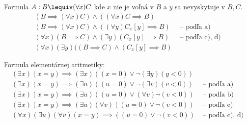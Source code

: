 \begin{priklad}
    \noindent
    Formula $A: B \lequiv (\forall x) C$ kde $x$ nie je voľná
    v $B$ a $y$ sa nevyskytuje v $B,C$.
    \begin{align*}
       (B \implies (\forall x) C) \land ((\forall x) C \implies B) &\\
       (B \implies (\forall x) C) \land ((\forall y) C_x[y] \implies B) 
       & \mbox{ -- podľa a)} \\
       (\forall x)(B \implies C) \land (\exists y) (C_x[y] \implies B) 
       & \mbox{ -- podľa c), d)} \\
       (\forall x)(\exists y)((B \implies C) \land (C_x[y] \implies B)
    \end{align*}
\end{priklad}

\begin{priklad}
    Formula elementárnej aritmetiky:
    \begin{align*}
        (\exists x) (x=y) \implies (\exists x)((x=0) \lor
                    \neg (\exists y)(y<0))& \\
        (\exists x) (x=y) \implies (\exists u)((u=0) \lor
                    \neg (\exists v)(v<0)) &\mbox{ -- podľa a)}\\
        (\exists x) (x=y) \implies (\exists u)((u=0) \lor
                    (\forall  v) \neg(v<0)) &\mbox{ -- podľa b)}\\
        (\exists x) (x=y) \implies (\exists u)(\forall v)
                ((u=0) \lor \neg(v<0)) &\mbox{ -- podľa e)}\\
        (\forall x)(\exists u)(\forall v) (x=y) \implies 
                ((u=0) \lor \neg(v<0)) &\mbox{ -- podľa c), d)}
    \end{align*}
\end{priklad}


